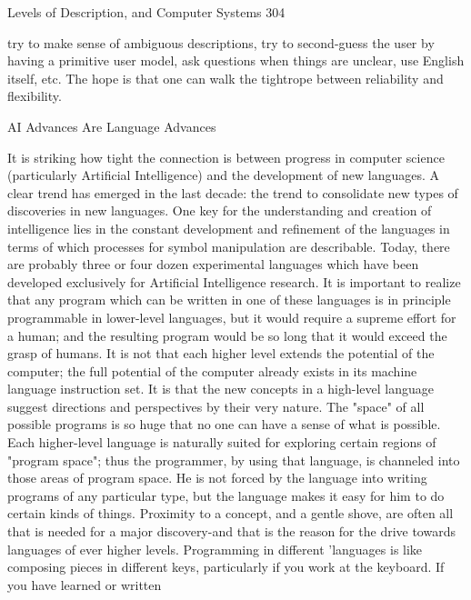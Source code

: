 Levels of Description, and Computer Systems                                                304

       try to make sense of ambiguous descriptions, try to second-guess the user by
       having a primitive user model, ask questions when things are unclear, use English
       itself, etc. The hope is that one can walk the tightrope between reliability and
       flexibility.

                             AI Advances Are Language Advances

       It is striking how tight the connection is between progress in computer science
       (particularly Artificial Intelligence) and the development of new languages. A
       clear trend has emerged in the last decade: the trend to consolidate new types of
       discoveries in new languages. One key for the understanding and creation of
       intelligence lies in the constant development and refinement of the languages in
       terms of which processes for symbol manipulation are describable. Today, there
       are probably three or four dozen experimental languages which have been
       developed exclusively for Artificial Intelligence research. It is important to realize
       that any program which can be written in one of these languages is in principle
       programmable in lower-level languages, but it would require a supreme effort for
       a human; and the resulting program would be so long that it would exceed the
       grasp of humans. It is not that each higher level extends the potential of the
       computer; the full potential of the computer already exists in its machine language
       instruction set. It is that the new concepts in a high-level language suggest
       directions and perspectives by their very nature.
                The "space" of all possible programs is so huge that no one can have a
       sense of what is possible. Each higher-level language is naturally suited for
       exploring certain regions of "program space"; thus the programmer, by using that
       language, is channeled into those areas of program space. He is not forced by the
       language into writing programs of any particular type, but the language makes it
       easy for him to do certain kinds of things. Proximity to a concept, and a gentle
       shove, are often all that is needed for a major discovery-and that is the reason for
       the drive towards languages of ever higher levels.
                Programming in different 'languages is like composing pieces in different
       keys, particularly if you work at the keyboard. If you have learned or written
